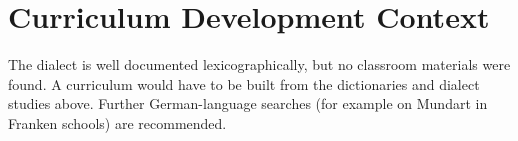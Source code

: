 \documentclass[12pt]{article}
\begin{document}
\section{Curriculum Development Context}
The dialect is well documented lexicographically, but no classroom materials were found. A curriculum would have to be built from the dictionaries and dialect studies above. Further German-language searches (for example on Mundart in Franken schools) are recommended.
\end{document}

